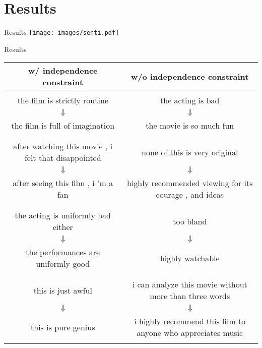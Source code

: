 \documentclass{beamer}
\begin{document}
\section{Results}
\begin{frame}{Results}
  \centering
  \texttt{[image: images/senti.pdf]}
\end{frame}

\begin{frame}{Results}  
  \begin{table}
    \tiny
    \centering
    \begin{tabular}{ c || c }
    \centering
    {\small \textbf{w/ independence constraint}} & {\small\textbf{w/o independence constraint}} \\ \hline       \hline \\
      the film is strictly routine & the acting is bad \\
      $\Downarrow$ & $\Downarrow$ \\
      the film is full of imagination & the movie is so much fun \\ \\
      \hline \\
      after watching this movie , i felt that disappointed & none of this is very original \\ 
      $\Downarrow$ & $\Downarrow$ \\
      after seeing this film , i 'm a fan & highly recommended viewing for its courage , and ideas\\ \\
      \hline \\
      the acting is uniformly bad either &  too bland \\
      $\Downarrow$ & $\Downarrow$ \\
      the performances are uniformly good & highly watchable \\ \\
      \hline \\
      this is just awful & i can analyze this movie without more than three words \\ 
      $\Downarrow$ & $\Downarrow$ \\
      this is pure genius & i highly recommend this film to anyone who appreciates music   \\ \\
    \end{tabular}    
  \end{table}
\end{frame}


{\tiny }
\end{document}
